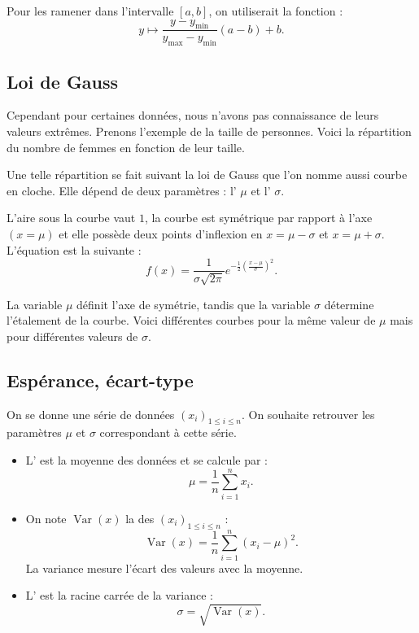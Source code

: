 \documentclass[11pt,class=report,crop=false]{standalone}
\begin{document}
Pour les ramener dans l'intervalle $[a,b]$, on utiliserait la fonction :
$$y \mapsto \frac{y - y_{\min}}{y_{\max} - y_{\min}}(a-b) + b.$$


\subsection{Loi de Gauss}


Cependant pour certaines données, nous n'avons pas connaissance de leurs valeurs extrêmes.
Prenons l'exemple de la taille de personnes. Voici la répartition du nombre de femmes en fonction de leur taille.


Une telle répartition se fait suivant la \og{}loi de Gauss\fg{} que l'on nomme aussi \og{}courbe en cloche\fg{}. Elle dépend de deux paramètres : l' $\mu$ et l' $\sigma$.

L'aire sous la courbe vaut $1$, la courbe est symétrique par rapport à l'axe $(x=\mu)$ et elle possède deux points d'inflexion en $x=\mu-\sigma$ et $x=\mu+\sigma$.
L'équation est la suivante :
$$f(x) = \frac{1}{\sigma\sqrt{2\pi}} e^{-\frac12\left(\frac{x-\mu}{\sigma}\right)^2}.$$

La variable $\mu$ définit l'axe de symétrie, tandis que la variable $\sigma$ détermine l'étalement de la courbe. Voici différentes courbes pour la même valeur de $\mu$ mais pour différentes valeurs de $\sigma$.





\subsection{Espérance, écart-type}

On se donne une série de données $(x_i)_{1\le i \le n}$. On souhaite retrouver les paramètres
$\mu$ et $\sigma$ correspondant à cette série.


\begin{itemize}
  \item L' est la moyenne des données et se calcule par :
$$\mu = \frac{1}{n} \sum_{i=1}^n x_i.$$

  \item On note $\operatorname{Var}(x)$ la  des $(x_i)_{1\le i \le n}$ :  
	$$\operatorname{Var}(x) = \frac{1}{n} \sum_{i=1}^{n}(x_i-\mu)^2.$$
	La variance mesure l'écart des valeurs avec la moyenne.
		
  \item L' est la racine carrée de la variance :
  $$\sigma = \sqrt{\operatorname{Var}(x)}.$$
\end{itemize}
\end{document}
